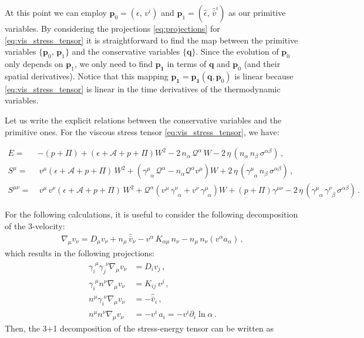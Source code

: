 \documentclass[prd,aps,twocolumn,floats,floatfix,nofootinbib,superscriptaddress] {revtex4-1}
\begin{document}
At this point we can employ $\mathbf{p}_0=(\epsilon,\,v^i)$ and $\mathbf{p}_1=(\hat\epsilon, \, \hat{\bar v}^i)$ as our primitive variables.  By considering the projections \eqref{eq:projections} for \eqref{eq:vis_stress_tensor} it is straightforward to find the map between the primitive variables $\{\mathbf{p}_0,\,\mathbf{p}_1\}$ and the conservative variables $\{\mathbf{q}\}$. Since the evolution of $\mathbf{p}_0$ only depends on $\mathbf{p}_1$, we  only need to find $\mathbf{p_1}$ in terms of $\mathbf{q}$ and $\mathbf{p}_0$ (and their spatial derivatives). Notice that this mapping $\mathbf{p_1}= \mathbf{p_1} (\mathbf{q},\mathbf{p}_0)$ is linear because  \eqref{eq:vis_stress_tensor} is linear in the time derivatives of the thermodynamic variables.

Let us write the explicit relations between the conservative variables and the primitive ones. For the viscous stress tensor \eqref{eq:vis_stress_tensor}, we have:
\begin{widetext}
\begin{align}
E=&-(p+\Pi)+(\epsilon+\mathcal{A}+p+\Pi)W^2-2\,n_\alpha\,\mathcal{Q^\alpha}\,W-2\,\eta \,(n_\alpha \, n_\beta \, \sigma^{\alpha\beta})\,,\label{eq:E_fluid}\\
S^\mu=&~v^\mu(\epsilon+\mathcal{A}+p+\Pi)\,W^2+  (\gamma^\mu_{\phantom{\mu}\alpha}\,\mathcal{Q}^\alpha -n_\alpha \mathcal{Q}^\alpha v^\mu)W + 2\,\eta\,(\gamma^\mu_{\phantom{\mu}\alpha}\,n_\beta\,\sigma^{\alpha\beta})\,, \label{eq:Si_fluid}\\
S^{\mu\nu}=&~v^\mu\,v^\nu(\epsilon+\mathcal{A}+p+\Pi)\,W^2 + \mathcal{Q}^\alpha(v^\mu\,\gamma^\nu_{\phantom{\nu}\alpha}+v^\nu\,\gamma^\mu_{\phantom{\nu}\alpha})W
+(p+\Pi)\gamma^{\mu\nu} - 2\,\eta\,(\gamma^\mu_{\phantom{\mu}\alpha}\,\gamma^\nu_{\phantom{\nu}\beta}\,\sigma^{\alpha\beta})\,.\label{eq:Sij_fluid}
\end{align}
\end{widetext}

For the following calculations, it is useful to consider the following decomposition of the 3-velocity:
\vspace{-5pt}
\begin{align}
\nabla_\mu v_\nu = D_\mu  v_\nu + n_\mu\,\hat{\bar v}_\nu - v^\alpha\,K_{\alpha\mu}\,n_\nu- n_\mu\,n_\nu(v^\alpha a_\alpha)\,,
\end{align}
which results in the following projections: 
\begin{align}
\gamma_i^{\phantom{i}\mu}\gamma_{j}^{\phantom{j}\nu}\nabla_\mu v_\nu&= D_i v_j\,,\\
\gamma_i^{\phantom{i}\mu} n^\nu \nabla_\mu v_\nu&= K_{ij}\,v^j\,,\\
n^\mu\gamma_i^{\phantom{i}\nu}\nabla_\mu v_\nu &= -\hat{\bar v}_i\,,\\
n^\mu n^\nu \nabla_\mu v_\nu &=- v^i\,a_i = -v^i \partial_i\ln\alpha\,.
\end{align}
Then, the 3+1 decomposition of the stress-energy tensor can be written as
\end{document}
